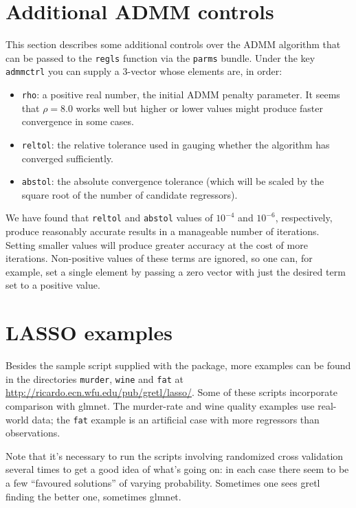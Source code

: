 \documentclass{article}
\begin{document}
\section{Additional ADMM controls}
\label{sec:add-controls}

This section describes some additional controls over the ADMM
algorithm that can be passed to the \texttt{regls} function via the
\texttt{parms} bundle. Under the key \texttt{admmctrl} you can supply
a 3-vector whose elements are, in order:
\begin{itemize}
\item \texttt{rho}: a positive real number, the initial ADMM penalty
  parameter. It seems that $\rho = 8.0$ works well but higher or lower
  values might produce faster convergence in some cases.
\item \texttt{reltol}: the relative tolerance used in gauging whether
  the algorithm has converged sufficiently.
\item \texttt{abstol}: the absolute convergence tolerance (which will
  be scaled by the square root of the number of candidate regressors).
\end{itemize}
We have found that \texttt{reltol} and \texttt{abstol} values of
$10^{-4}$ and $10^{-6}$, respectively, produce reasonably accurate
results in a manageable number of iterations. Setting smaller values
will produce greater accuracy at the cost of more iterations.
Non-positive values of these terms are ignored, so one can, for
example, set a single element by passing a zero vector with just the
desired term set to a positive value.

\section{LASSO examples}
\label{sec:examples}

Besides the sample script supplied with the package, more examples can
be found in the directories \texttt{murder}, \texttt{wine} and
\texttt{fat} at \url{http://ricardo.ecn.wfu.edu/pub/gretl/lasso/}.
Some of these scripts incorporate comparison with \textsf{glmnet}.
The murder-rate and wine quality examples use real-world data; the
\texttt{fat} example is an artificial case with more regressors than
observations.

Note that it's necessary to run the scripts involving randomized cross
validation several times to get a good idea of what's going on: in
each case there seem to be a few ``favoured solutions'' of varying
probability. Sometimes one sees gretl finding the better one,
sometimes \textsf{glmnet}.
\end{document}
